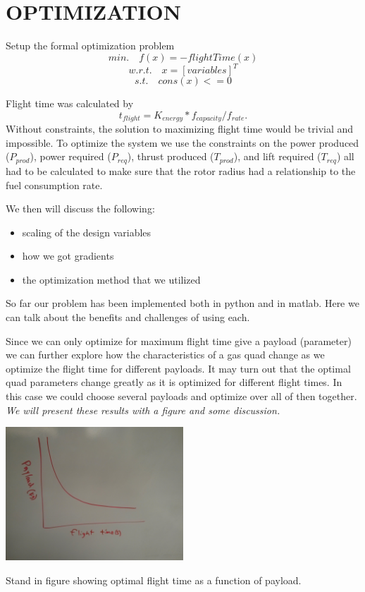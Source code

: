 \documentclass[letterpaper, 10 pt, conference]{ieeeconf}  %
\makeatletter
\newenvironment{figurehere}
  {\def\@captype{figure}}
  {}
\newcommand{\of}[1]{\ensuremath{\left(#1\right)}}
\makeatother
\begin{document}
\section{OPTIMIZATION}

Setup the formal optimization problem
\begin{equation}
min. \quad f\of{x} = -flightTime\of{x}
\label{eq:objective}
\end{equation}
\begin{equation}
w.r.t. \quad x = [variables]^T
\label{eq:vars}
\end{equation}
\begin{equation}
s.t. \quad cons\of{x} <= 0 
\label{eq:constrants}
\end{equation}

Flight time was calculated by 
\begin{equation}
	t_{flight} = K_{energy}*f_{capacity}/f_{rate}.
\end{equation}
Without constraints, the solution to maximizing flight time would be trivial and impossible. To optimize the system we use the constraints on the power produced ($P_{prod}$), power required ($P_{req}$), thrust produced ($T_{prod}$), and lift required ($T_{req}$) all had to be calculated to make sure that the rotor radius had a relationship to the fuel consumption rate. 

We then will discuss the following:
\begin{itemize}
	\item{scaling of the design variables}
	\item{how we got gradients}
	\item{the optimization method that we utilized}
\end{itemize}

So far our problem has been implemented both in python and in matlab.  Here we can talk about the benefits and challenges of using each. 

Since we can only optimize for maximum flight time give a payload (parameter) we can further explore how the characteristics of a gas quad change as we optimize the flight time for different payloads. It may turn out that the optimal quad parameters change greatly as it is optimized for different flight times.  In this case we could choose several payloads and optimize over all of then together. \textit{We will present these results with a figure and some discussion.}

\begin{figurehere}
	\includegraphics[width=0.5\textwidth]{payload.jpg}
	\caption{Stand in figure showing optimal flight time as a function of payload.}
		\label{fig:payload}
\end{figurehere}
\end{document}
